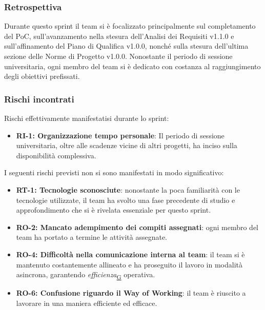 \documentclass[a4paper,12pt]{article}
\begin{document}
        \subsubsection{Retrospettiva}
        Durante questo sprint il team si è focalizzato principalmente sul completamento del PoC, sull'avanzamento nella stesura dell'Analisi dei Requisiti v1.1.0 e sull'affinamento del Piano di Qualifica v1.0.0, nonché sulla stesura dell'ultima sezione delle Norme di Progetto v1.0.0. Nonostante il periodo di sessione universitaria, ogni membro del team si è dedicato con costanza al raggiungimento degli obiettivi prefissati.

        \subsubsection{Rischi incontrati}{
            Rischi effettivamente manifestatisi durante lo sprint:
            \begin{itemize}
                \item \textbf{RI-1: Organizzazione tempo personale}: Il periodo di sessione universitaria, oltre alle scadenze vicine di altri progetti, ha inciso sulla disponibilità complessiva.
                \end{itemize}
            
            I seguenti rischi previsti non si sono manifestati in modo significativo:
            \begin{itemize}
                \item \textbf{RT-1: Tecnologie sconosciute}: nonostante la poca familiarità con le tecnologie utilizzate, il team ha svolto una fase precedente di studio e approfondimento che si è rivelata essenziale per questo sprint.
                \item \textbf{RO-2: Mancato adempimento dei compiti assegnati}: ogni membro del team ha portato a termine le attività assegnate.                
                \item \textbf{RO-4: Difficoltà nella comunicazione interna al team}: il team si è mantenuto costantemente allineato e ha proseguito il lavoro in modalità asincrona, garantendo \textit{efficienza}\textsubscript{\href{https://atlasteam9.github.io/Atlas/glossario.html\#Efficienza}{G}} operativa.
                \item \textbf{RO-6: Confusione riguardo il Way of Working}: il team è riuscito a lavorare in una maniera efficiente ed efficace.
            \end{itemize}
        }
\end{document}
